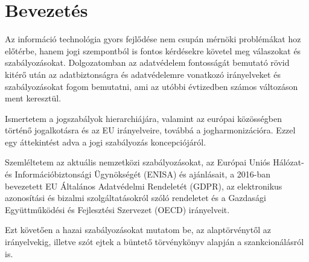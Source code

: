 \chapter{Bevezetés}

Az információ technológia gyors fejlődése nem csupán mérnöki problémákat hoz előtérbe, hanem jogi szempontból is fontos kérdésekre követel meg válaszokat és szabályozásokat. Dolgozatomban az adatvédelem fontosságát bemutató rövid kitérő után az adatbiztonságra és adatvédelemre vonatkozó irányelveket és szabályozásokat fogom bemutatni, ami az utóbbi évtizedben számos változáson ment keresztül.

Ismertetem a jogszabályok hierarchiájára, valamint az európai közösségben történő jogalkotásra és az EU irányelveire, továbbá a jogharmonizációra. Ezzel egy áttekintést adva a jogi szabályozás koncepciójáról.

Szemléltetem az aktuális nemzetközi szabályozásokat, az Európai Uniós Hálózat- és Információbiztonsági Ügynökségét (ENISA) és ajánlásait, a 2016-ban bevezetett EU Általános Adatvédelmi Rendeletét (GDPR), az elektronikus azonosítási és bizalmi szolgáltatásokról szóló rendeletet és a Gazdasági Együttműködési és Fejlesztési Szervezet (OECD) irányelveit.

Ezt követően a hazai szabályozásokat mutatom be, az alaptörvénytől az irányelvekig, illetve szót ejtek a büntető törvénykönyv alapján a szankcionálásról is.